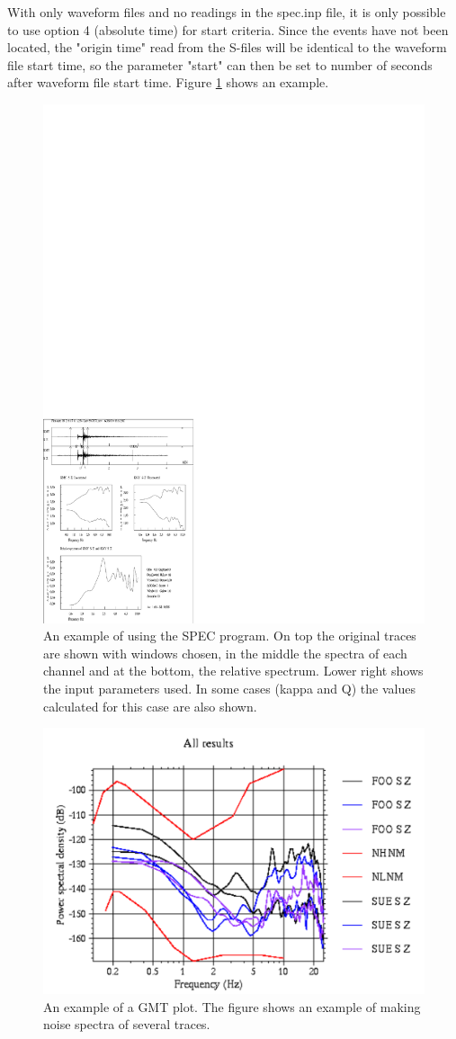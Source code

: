 With only waveform files and no readings in the spec.inp file, it is only possible to use option 4 (absolute time) for start criteria. Since the events have not been located, the "origin time" read from the S-files will be identical to the waveform file start time, so the parameter "start" can then be set to number of seconds after waveform file start time. Figure 
\ref{fig:spec-example}
shows an example. 

\begin{figure}
\centerline{\includegraphics[width=0.9\linewidth]{fig/spec-example}}
\caption{
An example of using the SPEC program. On top the original traces are shown with windows chosen, in the middle the spectra of each channel and at the bottom, the relative spectrum. Lower right shows the input parameters used. In some cases (kappa and Q) the values calculated for this case are also shown.}
\label{fig:spec-example}
\end{figure}


\begin{figure}
\centerline{\includegraphics[width=0.9\linewidth]{fig/fig43}}
\caption{An example of a GMT plot. The figure shows an 
example of making noise spectra of several traces.}
\end{figure}

